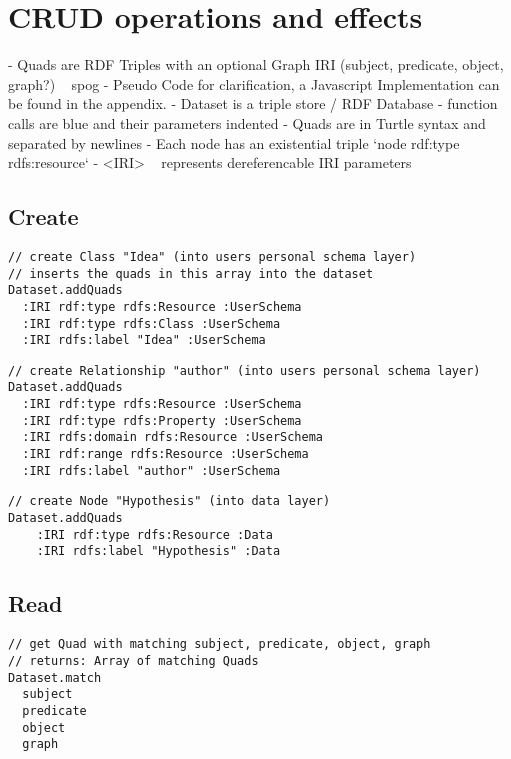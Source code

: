\section{CRUD operations and effects}

- Quads are RDF Triples with an optional Graph IRI 
(subject, predicate, object, graph?) ~ spog
- Pseudo Code for clarification, a Javascript Implementation can be found in the appendix.
    - Dataset is a triple store / RDF Database
    - function calls are blue and their parameters indented
    - Quads are in Turtle syntax and separated by newlines
    - Each node has an existential triple `node rdf:type rdfs:resource`
    - <IRI> ~ represents dereferencable IRI parameters

\subsection*{Create}

\begin{lstlisting}
// create Class "Idea" (into users personal schema layer)
// inserts the quads in this array into the dataset
Dataset.addQuads
  :IRI rdf:type rdfs:Resource :UserSchema
  :IRI rdf:type rdfs:Class :UserSchema
  :IRI rdfs:label "Idea" :UserSchema
\end{lstlisting}

\begin{lstlisting}
// create Relationship "author" (into users personal schema layer)
Dataset.addQuads
  :IRI rdf:type rdfs:Resource :UserSchema
  :IRI rdf:type rdfs:Property :UserSchema
  :IRI rdfs:domain rdfs:Resource :UserSchema
  :IRI rdf:range rdfs:Resource :UserSchema
  :IRI rdfs:label "author" :UserSchema    
\end{lstlisting}

\begin{lstlisting}
// create Node "Hypothesis" (into data layer)
Dataset.addQuads
    :IRI rdf:type rdfs:Resource :Data
    :IRI rdfs:label "Hypothesis" :Data

\end{lstlisting}

\subsection*{Read}  

\begin{lstlisting}
// get Quad with matching subject, predicate, object, graph 
// returns: Array of matching Quads
Dataset.match
  subject 
  predicate
  object
  graph
\end{lstlisting}





